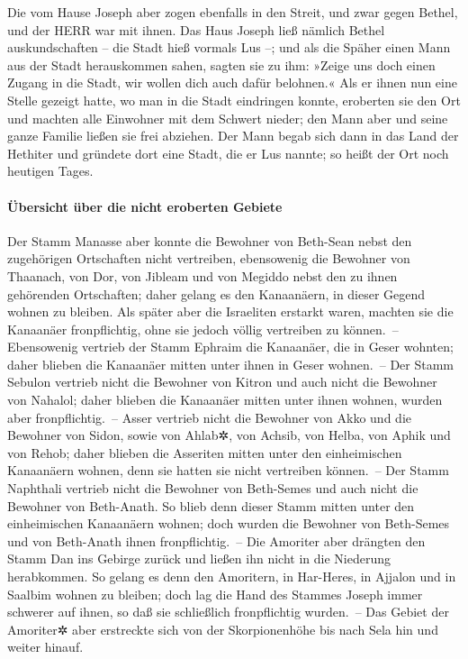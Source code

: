 Die vom Hause Joseph aber zogen ebenfalls in den Streit,
und zwar gegen Bethel, und der HERR war mit ihnen. Das
Haus Joseph ließ nämlich Bethel auskundschaften -- die Stadt hieß
vormals Lus --; und als die Späher einen Mann aus der
Stadt herauskommen sahen, sagten sie zu ihm: »Zeige uns doch einen
Zugang in die Stadt, wir wollen dich auch dafür belohnen.«
Als er ihnen nun eine Stelle gezeigt hatte, wo man in die
Stadt eindringen konnte, eroberten sie den Ort und machten alle
Einwohner mit dem Schwert nieder; den Mann aber und seine ganze Familie
ließen sie frei abziehen. Der Mann begab sich dann in das
Land der Hethiter und gründete dort eine Stadt, die er Lus nannte; so
heißt der Ort noch heutigen Tages.

\hypertarget{uxfcbersicht-uxfcber-die-nicht-eroberten-gebiete}{%
\paragraph{Übersicht über die nicht eroberten
Gebiete}\label{uxfcbersicht-uxfcber-die-nicht-eroberten-gebiete}}

Der Stamm Manasse aber konnte die Bewohner von Beth-Sean
nebst den zugehörigen Ortschaften nicht vertreiben, ebensowenig die
Bewohner von Thaanach, von Dor, von Jibleam und von Megiddo nebst den zu
ihnen gehörenden Ortschaften; daher gelang es den Kanaanäern, in dieser
Gegend wohnen zu bleiben. Als später aber die Israeliten
erstarkt waren, machten sie die Kanaanäer fronpflichtig, ohne sie jedoch
völlig vertreiben zu können.~-- Ebensowenig vertrieb der
Stamm Ephraim die Kanaanäer, die in Geser wohnten; daher blieben die
Kanaanäer mitten unter ihnen in Geser wohnen.~-- Der
Stamm Sebulon vertrieb nicht die Bewohner von Kitron und auch nicht die
Bewohner von Nahalol; daher blieben die Kanaanäer mitten unter ihnen
wohnen, wurden aber fronpflichtig.~-- Asser vertrieb
nicht die Bewohner von Akko und die Bewohner von Sidon, sowie von
Ahlab✲, von Achsib, von Helba, von Aphik und von Rehob;
daher blieben die Asseriten mitten unter den
einheimischen Kanaanäern wohnen, denn sie hatten sie nicht vertreiben
können.~-- Der Stamm Naphthali vertrieb nicht die
Bewohner von Beth-Semes und auch nicht die Bewohner von Beth-Anath. So
blieb denn dieser Stamm mitten unter den einheimischen Kanaanäern
wohnen; doch wurden die Bewohner von Beth-Semes und von Beth-Anath ihnen
fronpflichtig.~-- Die Amoriter aber drängten den Stamm
Dan ins Gebirge zurück und ließen ihn nicht in die Niederung
herabkommen. So gelang es denn den Amoritern, in
Har-Heres, in Ajjalon und in Saalbim wohnen zu bleiben; doch lag die
Hand des Stammes Joseph immer schwerer auf ihnen, so daß sie schließlich
fronpflichtig wurden.~-- Das Gebiet der Amoriter✲ aber
erstreckte sich von der Skorpionenhöhe bis nach Sela hin und weiter
hinauf.

